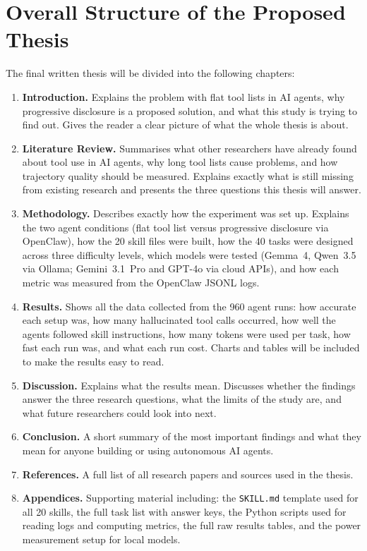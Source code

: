 \section{Overall Structure of the Proposed Thesis}
\label{sec:structure}

The final written thesis will be divided into the following chapters:

\begin{enumerate}
    \item \textbf{Introduction.} Explains the problem with flat tool lists in AI agents, why progressive disclosure is a proposed solution, and what this study is trying to find out. Gives the reader a clear picture of what the whole thesis is about.

    \item \textbf{Literature Review.} Summarises what other researchers have already found about tool use in AI agents, why long tool lists cause problems, and how trajectory quality should be measured. Explains exactly what is still missing from existing research and presents the three questions this thesis will answer.

    \item \textbf{Methodology.} Describes exactly how the experiment was set up. Explains the two agent conditions (flat tool list versus progressive disclosure via OpenClaw), how the 20 skill files were built, how the 40 tasks were designed across three difficulty levels, which models were tested (Gemma~4, Qwen~3.5 via Ollama; Gemini~3.1~Pro and GPT-4o via cloud APIs), and how each metric was measured from the OpenClaw JSONL logs.

    \item \textbf{Results.} Shows all the data collected from the 960 agent runs: how accurate each setup was, how many hallucinated tool calls occurred, how well the agents followed skill instructions, how many tokens were used per task, how fast each run was, and what each run cost. Charts and tables will be included to make the results easy to read.

    \item \textbf{Discussion.} Explains what the results mean. Discusses whether the findings answer the three research questions, what the limits of the study are, and what future researchers could look into next.

    \item \textbf{Conclusion.} A short summary of the most important findings and what they mean for anyone building or using autonomous AI agents.

    \item \textbf{References.} A full list of all research papers and sources used in the thesis.

    \item \textbf{Appendices.} Supporting material including: the \texttt{SKILL.md} template used for all 20 skills, the full task list with answer keys, the Python scripts used for reading logs and computing metrics, the full raw results tables, and the power measurement setup for local models.
\end{enumerate}
